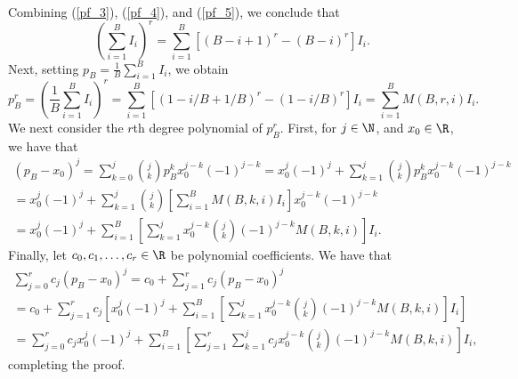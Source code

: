 \documentclass[12pt]{article}
\begin{document}
\begin{appendices}
\begin{multline}
\end{multline}
Combining (\ref{pf_3}), (\ref{pf_4}), and (\ref{pf_5}), we conclude that
$$ \left( \sum_{i=1}^B I_i \right)^r = \sum_{i=1}^B \left[ (B - i + 1)^r - (B - i)^r \right] I_i.$$
Next, setting $p_B = \frac{1}{B} \sum_{i=1}^B I_i$, we obtain
$$p^r_B = \left( \frac{1}{B}\sum_{i=1}^B I_i \right)^r = \sum_{i=1}^B \left[ (1 - i/B + 1/B)^r - (1 - i/B)^r \right] I_i = \sum_{i=1}^B M(B,r,i) I_i.$$ We next consider the $r$th degree polynomial of $p^r_B$. First, for $j \in \N$, and $x_0 \in \R$, we have that
\begin{multline*}
\left(p_B - x_0 \right)^j = \sum_{k=0}^j \binom{j}{k} p_B^k x_0^{j-k}(-1)^{j-k} = x^j_0(-1)^j + \sum_{k=1}^j \binom{j}{k}p_B^k x_0^{j - k}(-1)^{j-k} \\ = x^j_0(-1)^j + \sum_{k=1}^j \binom{j}{k} \left[\sum_{i=1}^B M(B,k,i) I_i \right] x^{j-k}_0(-1)^{j-k} \\ = x^j_0(-1)^j + \sum_{i=1}^B  \left[ \sum_{k=1}^j x_0^{j-k} \binom{j}{k} (-1)^{j-k} M(B,k,i) \right] I_i.
\end{multline*}
Finally, let $c_0, c_1, \dots, c_r \in \R$ be polynomial coefficients. We have that
\begin{multline*}
\sum_{j=0}^r c_j \left(p_B - x_0 \right)^j  = c_0 + \sum_{j=1}^r c_j (p_B - x_0)^j \\ = c_0 + \sum_{j=1}^r c_j \left[x_0^j(-1)^j + \sum_{i=1}^B \left[\sum_{k=1}^j x_0^{j-k} \binom{j}{k}(-1)^{j-k} M(B,k,i) \right] I_i \right] \\ = \sum_{j=0}^r c_j x_0^j(-1)^j + \sum_{i=1}^B \left[\sum_{j=1}^r \sum_{k=1}^j c_j x_0^{j-k} \binom{j}{k} (-1)^{j-k} M(B,k,i) \right] I_i,
\end{multline*}
completing the proof.

\end{appendices}
\end{document}

